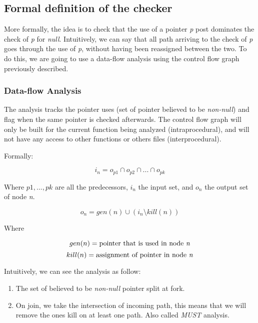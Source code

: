 \subsection{Formal definition of the checker}
\label{subsec:checker_formal_definition}
More formally, the idea is to check that the use of a pointer \emph{p} post dominates the check of \emph{p} for \emph{null}.
Intuitively, we can say that all path arriving to the check of \emph{p} goes through the use of \emph{p}, without having been reassigned between the two. 
To do this, we are going to use a data-flow analysis using the control flow graph previously described.

\subsubsection{Data-flow Analysis}
\label{subsubsec:data_flow_analysis}

The analysis tracks the pointer uses (set of pointer believed to be \emph{non-null}) and flag when the same pointer is checked afterwards.
The control flow graph will only be built for the current function being analyzed (intraprocedural), and will not have any access to other functions or others files (interprocedural).

Formally:

\begin{equation}\label{eqn:dataflow1}
i_{n} = o_{p1}  \cap   o_{p2}  \cap  ... \cap   o_{pk}
\end{equation}

Where $p1, ..., pk$ are all the predecessors, $i_{n}$ the input set, and  $o_{n}$ the output set of node \emph{n}.

\begin{equation}\label{eqn:dataflow2}
o_{n} = gen(n)  \cup   (i_{n} \setminus kill(n))
\end{equation}

Where

\begin{equation}\label{eqn:dataflow3}
gen(n) =\text{pointer that is used in node \emph{n}}
\end{equation}
\begin{equation}\label{eqn:dataflow4}
kill(n) = \text{assignment of pointer in node \emph{n}}
\end{equation}

Intuitively, we can see the analysis as follow:
\begin{enumerate}
	\item The set of believed to be \emph{non-null} pointer split at fork. \newline 
	\item On join, we take the intersection of incoming path, this means that we will remove the ones kill on at least one path. Also called \emph{MUST} analysis. \newline 
\end{enumerate}

